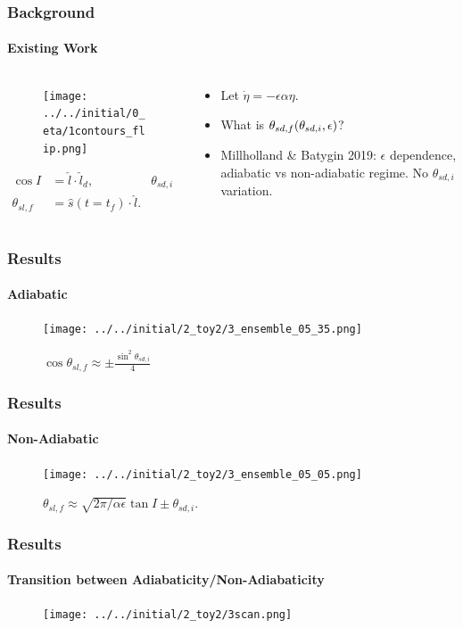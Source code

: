 \documentclass[dvipsnames]{beamer}
\DeclarePairedDelimiter\p{\lparen}{\rparen}
\begin{document}
\begin{frame}
    \frametitle{Background}
    \framesubtitle{Existing Work}

    \begin{columns}
        \begin{column}{0.5\textwidth}
            \begin{figure}[t]
                \centering
                \texttt{[image: ../../initial/0\_eta/1contours\_flip.png]}
            \end{figure}
            {\scriptsize
            \begin{align*}
                \cos I &= \hat{l} \cdot \hat{l}_d,&
                \theta_{sd, i} &= \hat{s}(t=0) \cdot \hat{l}_d,\\
                \theta_{sl, f} &= \hat{s}(t=t_f) \cdot \hat{l}.
            \end{align*}}
        \end{column}
        \begin{column}{0.5\textwidth}
            \begin{itemize}
                \item Let $\dot{\eta} = -\epsilon\alpha\eta$.

                \item What is $\theta_{sd, f}\p*{\theta_{sd, i}, \epsilon}$?

                \item Millholland \& Batygin 2019: $\epsilon$ dependence,
                    adiabatic vs non-adiabatic regime. No $\theta_{sd, i}$
                    variation.
            \end{itemize}
        \end{column}
    \end{columns}
\end{frame}

\begin{frame}
    \frametitle{Results}
    \framesubtitle{Adiabatic}

    \begin{figure}[t]
        \centering
        \texttt{[image: ../../initial/2\_toy2/3\_ensemble\_05\_35.png]}
        \caption{$\cos \theta_{sl, f} \approx \pm \frac{\sin^2\theta_{sd,
        i}}{4}$}
    \end{figure}
\end{frame}

\begin{frame}
    \frametitle{Results}
    \framesubtitle{Non-Adiabatic}

    \begin{figure}[t]
        \centering
        \texttt{[image: ../../initial/2\_toy2/3\_ensemble\_05\_05.png]}
        \caption{$\theta_{sl, f} \approx
        \sqrt{2\pi/\alpha\epsilon}\tan I \pm \theta_{sd, i}$.}
    \end{figure}
\end{frame}

\begin{frame}
    \frametitle{Results}
    \framesubtitle{Transition between Adiabaticity/Non-Adiabaticity}

    \begin{figure}[t]
        \centering
        \texttt{[image: ../../initial/2\_toy2/3scan.png]}
    \end{figure}
\end{frame}
\end{document}
